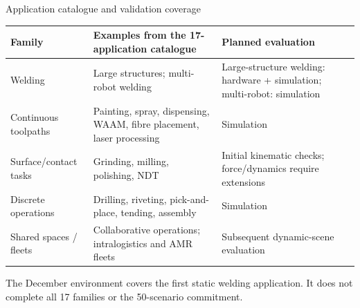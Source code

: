 \documentclass[aspectratio=169,10pt]{beamer}
\begin{document}
\begin{frame}{Application catalogue and validation coverage}
\small\renewcommand{\arraystretch}{1.25}
\begin{tabularx}{\textwidth}{@{}p{}Xp{}@{}}
\toprule
Family & Examples from the 17-application catalogue & Planned evaluation\\\midrule
Welding & Large structures; multi-robot welding & Large-structure welding: hardware + simulation; multi-robot: simulation\\
Continuous toolpaths & Painting, spray, dispensing, WAAM, fibre placement, laser processing & Simulation\\
Surface/contact tasks & Grinding, milling, polishing, NDT & Initial kinematic checks; force/dynamics require extensions\\
Discrete operations & Drilling, riveting, pick-and-place, tending, assembly & Simulation\\
Shared spaces / fleets & Collaborative operations; intralogistics and AMR fleets & Subsequent dynamic-scene evaluation\\\bottomrule
\end{tabularx}\par\medskip\small The December environment covers the first static welding application. It does not complete all 17 families or the 50-scenario commitment.
\end{frame}
\end{document}
